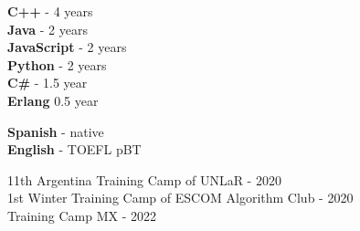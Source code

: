 \documentclass[9pt]{developercv} %
\begin{document}

\begin{minipage}[t]{0.25\textwidth}
	\vspace{-\baselineskip} %

	
	\textbf{C++} - 4 years\\
	\textbf{Java} - 2 years\\
	\textbf{JavaScript} - 2 years\\
	\textbf{Python} - 2 years\\
	\textbf{C\#} - 1.5 year\\
    \textbf{Erlang} 0.5 year
\end{minipage}
\hfill
\begin{minipage}[t]{0.17\textwidth}
	\vspace{-\baselineskip} %
	
	
	\textbf{Spanish} - native\\
	\textbf{English} - TOEFL pBT
\end{minipage}
\hfill
\begin{minipage}[t]{0.48\textwidth}
	\vspace{-\baselineskip} %
	
	
	11th Argentina Training Camp of UNLaR - 2020\\
	1st Winter Training Camp of ESCOM Algorithm Club - 2020\\
	Training Camp MX - 2022
\end{minipage}

\end{document}
